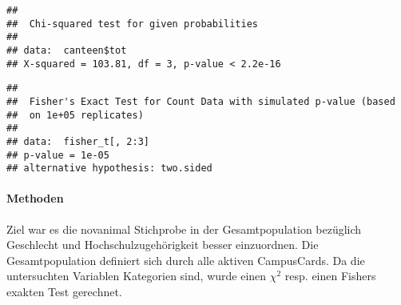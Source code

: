 \documentclass[]{article}
\newenvironment{Shaded}{\begin{snugshade}}{\end{snugshade}}
\newcommand{\CommentTok}[1]{\textcolor[rgb]{0.56,0.35,0.01}{\textit{#1}}}
\newcommand{\DataTypeTok}[1]{\textcolor[rgb]{0.13,0.29,0.53}{#1}}
\newcommand{\DecValTok}[1]{\textcolor[rgb]{0.00,0.00,0.81}{#1}}
\newcommand{\KeywordTok}[1]{\textcolor[rgb]{0.13,0.29,0.53}{\textbf{#1}}}
\newcommand{\NormalTok}[1]{#1}
\newcommand{\OperatorTok}[1]{\textcolor[rgb]{0.81,0.36,0.00}{\textbf{#1}}}
\newcommand{\OtherTok}[1]{\textcolor[rgb]{0.56,0.35,0.01}{#1}}
\newcommand{\StringTok}[1]{\textcolor[rgb]{0.31,0.60,0.02}{#1}}
\let\oldparagraph\paragraph
\renewcommand{\paragraph}[1]{\oldparagraph{#1}\mbox{}}
\begin{document}
\begin{verbatim}
## 
##  Chi-squared test for given probabilities
## 
## data:  canteen$tot
## X-squared = 103.81, df = 3, p-value < 2.2e-16
\end{verbatim}

\begin{Shaded}
\end{Shaded}

\begin{verbatim}
## 
##  Fisher's Exact Test for Count Data with simulated p-value (based
##  on 1e+05 replicates)
## 
## data:  fisher_t[, 2:3]
## p-value = 1e-05
## alternative hypothesis: two.sided
\end{verbatim}

\hypertarget{methoden}{%
\paragraph{Methoden}\label{methoden}}

Ziel war es die novanimal Stichprobe in der Gesamtpopulation bezüglich
Geschlecht und Hochschulzugehörigkeit besser einzuordnen. Die
Gesamtpopulation definiert sich durch alle aktiven CampusCards. Da die
untersuchten Variablen Kategorien sind, wurde einen \(\chi^2\) resp.
einen Fishers exakten Test gerechnet.
\end{document}
